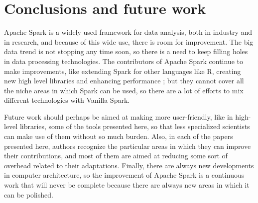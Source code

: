 \documentclass{article}
\begin{document}


\section{Conclusions and future work}
\label{sec:conclusion}

Apache Spark is a widely used framework for data analysis, both in industry and in research, and because of this wide use, there is room for improvement. The big data trend is not stopping any time soon, so there is a need to keep filling holes in data processing technologies. The contributors of Apache Spark continue to make improvements, like extending Spark for other languages like R, creating new high level libraries and enhancing performance \cite{zaharia_apache_2016}; but they cannot cover all the niche areas in which Spark can be used, so there are a lot of efforts to mix different technologies with Vanilla Spark.


Future work should perhaps be aimed at making more user-friendly, like in high-level libraries, some of the tools presented here, so that less specialized scientists can make use of them without so much burden. Also, in each of the papers presented here, authors recognize the particular areas in which they can improve their contributions, and most of them are aimed at reducing some sort of overhead related to their adaptations. Finally, there are always new developments in computer architecture, so the improvement of Apache Spark is a continuous work that will never be complete because there are always new areas in which it can be polished.


\printbibliography
\end{document}
